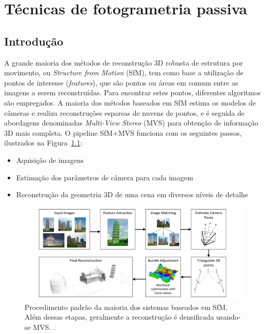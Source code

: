 \chapter{Técnicas de fotogrametria passiva}\label{cap:pontosdeinteresse}
%
\section*{Introdução}

A grande maioria dos métodos de reconstrução 3D robusta de estrutura por movimento, ou \emph{Structure
from Motion} (SfM), tem como base a utilização de pontos de interesse
(\emph{features}), que são pontos ou áreas em comum entre as imagens a serem
reconstruídas. Para encontrar estes pontos, diferentes algoritmos são empregados. 
A maioria dos métodos baseados em SfM estima os modelos de câmeras e
realiza reconstruções esparsas de nuvens de pontos, e é seguida de abordagens denominadas
\emph{Multi-View Stereo} (MVS) para obtenção de informação 3D mais completa.  O
pipeline SfM+MVS funciona com os seguintes passos, ilustrados na Figura~\ref{fig:sfmpipeline}:

\begin{itemize}
\item{Aquisição de imagens}
\item{Estimação dos parâmetros de câmera para cada imagem}
\item{Reconstrução da geometria 3D de uma cena em diversos níveis de detalhe}
\end{itemize}

\begin{figure}[!h]
	\centering
	\includegraphics[width=\linewidth]{figs/pipelinesfm.png}
	\caption{%
	Procedimento padrão da maioria dos sistemas baseados em SfM. Além dessas
  etapas, geralmente a reconstrução é densificada usando-se MVS.
	\protect\cite{theia-manual}.
	}\label{fig:sfmpipeline}
\end{figure}

